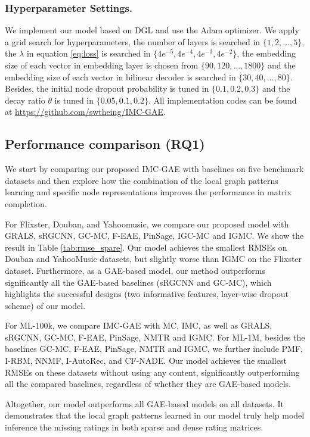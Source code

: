 \documentclass[sigconf]{acmart}
\begin{document}
\subsubsection{Hyperparameter Settings.} We implement our model based on DGL \cite{wang2019deep} and use the Adam optimizer. We apply a grid search for hyperparameters, the number of layers is searched in $\{1, 2, ... , 5\}$, the $\lambda$ in equation \ref{eq:loss} is searched in $\{4e^{-5}, 4e^{-4}, 4e^{-3}, 4e^{-2}\}$, the embedding size of each vector in embedding layer is chosen from $\{90, 120,..., 1800\}$ and the embedding size of each vector in bilinear decoder is searched in $\{30, 40, ... , 80\}$. Besides, the initial node dropout probability is tuned in $\{0.1, 0.2, 0.3\}$ and the decay ratio $\theta$ is tuned in $\{0.05, 0.1, 0.2\}$. 
All implementation codes can be found at \url{https://github.com/swtheing/IMC-GAE}.



\subsection{Performance comparison (RQ1)}
We start by comparing our proposed IMC-GAE with baselines on five benchmark datasets and then explore how the combination of the local graph patterns learning and specific node representations improves the performance in matrix completion.

For Flixster, Douban, and Yahoomusic, we compare our proposed model with GRALS, sRGCNN, GC-MC, F-EAE, PinSage, IGC-MC and IGMC. We show the result in Table \ref{tab:rmse_spare}. Our model achieves the smallest RMSEs on Douban and YahooMusic datasets, but slightly worse than IGMC on the Flixster dataset. Furthermore, as a GAE-based model, our method outperforms significantly all the GAE-based baselines (sRGCNN and GC-MC), which highlights the successful designs (two informative features, layer-wise dropout scheme) of our model.    

For ML-100k, we compare IMC-GAE with MC, IMC, as well as GRALS, sRGCNN, GC-MC, F-EAE, PinSage, NMTR and IGMC. For ML-1M, besides the baselines GC-MC, F-EAE, PinSage, NMTR and IGMC, we further include PMF, I-RBM, NNMF, I-AutoRec, and CF-NADE. Our model achieves the smallest RMSEs on these datasets without using any content, significantly outperforming all the compared baselines, regardless of whether they are GAE-based models. 

Altogether, our model outperforms all GAE-based models on all datasets. It demonstrates that the local graph patterns learned in our model truly help model inference the missing ratings in both sparse and dense rating matrices. 
\end{document}
